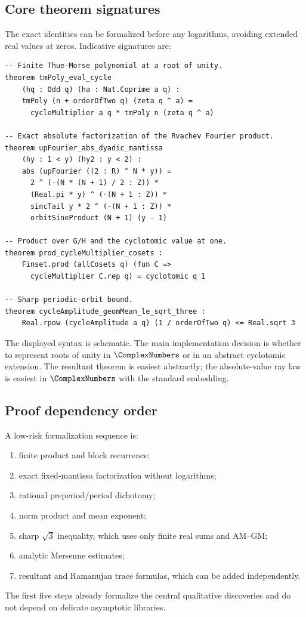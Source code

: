 \documentclass[11pt,oneside]{article}
\theoremstyle{definition}
\theoremstyle{remark}
\begin{document}
\subsection{Core theorem signatures}

The exact identities can be formalized before any logarithms, avoiding extended
real values at zeros. Indicative signatures are:

\begin{lstlisting}[style=pseudo,caption={Indicative Lean theorem interfaces.}]
-- Finite Thue-Morse polynomial at a root of unity.
theorem tmPoly_eval_cycle
    (hq : Odd q) (ha : Nat.Coprime a q) :
    tmPoly (n + orderOfTwo q) (zeta q ^ a) =
      cycleMultiplier a q * tmPoly n (zeta q ^ a)

-- Exact absolute factorization of the Rvachev Fourier product.
theorem upFourier_abs_dyadic_mantissa
    (hy : 1 < y) (hy2 : y < 2) :
    abs (upFourier ((2 : R) ^ N * y)) =
      2 ^ (-(N * (N + 1) / 2 : Z)) *
      (Real.pi * y) ^ (-(N + 1 : Z)) *
      sincTail y * 2 ^ (-(N + 1 : Z)) *
      orbitSineProduct (N + 1) (y - 1)

-- Product over G/H and the cyclotomic value at one.
theorem prod_cycleMultiplier_cosets :
    Finset.prod (allCosets q) (fun C =>
      cycleMultiplier C.rep q) = cyclotomic q 1

-- Sharp periodic-orbit bound.
theorem cycleAmplitude_geomMean_le_sqrt_three :
    Real.rpow (cycleAmplitude a q) (1 / orderOfTwo q) <= Real.sqrt 3
\end{lstlisting}

The displayed syntax is schematic. The main implementation decision is whether to
represent roots of unity in $\ComplexNumbers$ or in an abstract cyclotomic extension. The
resultant theorem is easiest abstractly; the absolute-value ray law is easiest in
$\ComplexNumbers$ with the standard embedding.

\subsection{Proof dependency order}

A low-risk formalization sequence is:
\begin{enumerate}
 \item finite product and block recurrence;
 \item exact fixed-mantissa factorization without logarithms;
 \item rational preperiod/period dichotomy;
 \item norm product and mean exponent;
 \item sharp $\sqrt3$ inequality, which uses only finite real sums and AM--GM;
 \item analytic Mersenne estimates;
 \item resultant and Ramanujan trace formulas, which can be added independently.
\end{enumerate}
The first five steps already formalize the central qualitative discoveries and do
not depend on delicate asymptotic libraries.
\end{document}
